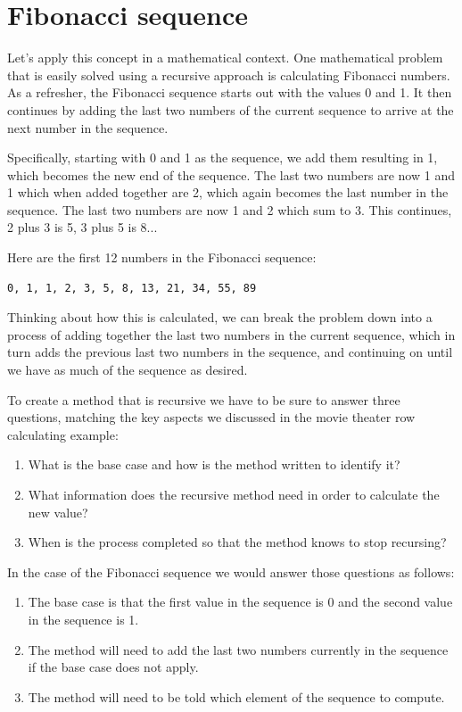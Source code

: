 \section{Fibonacci sequence}    

Let's apply this concept in a mathematical context. One mathematical problem that is easily solved using a recursive approach is calculating Fibonacci numbers. As a refresher, the Fibonacci sequence starts out with the values 0 and 1. It then continues by adding the last two numbers of the current sequence to arrive at the next number in the sequence.

Specifically, starting with 0 and 1 as the sequence, we add them resulting in 1, which becomes the new end of the sequence. The last two numbers are now 1 and 1 which when added together are 2, which again becomes the last number in the sequence. The last two numbers are now 1 and 2 which sum to 3. This continues, 2 plus 3 is 5, 3 plus 5 is 8...

Here are the first 12 numbers in the Fibonacci sequence:

\beforeverb
\begin{verbatim}
0, 1, 1, 2, 3, 5, 8, 13, 21, 34, 55, 89
\end{verbatim}

Thinking about how this is calculated, we can break the problem down into a process of adding together the last two numbers in the current sequence, which in turn adds the previous last two numbers in the sequence, and continuing on until we have as much of the sequence as desired.

To create a method that is recursive we have to be sure to answer three questions, matching the key aspects we discussed in the movie theater row calculating example:

\begin{enumerate}
	\item What is the base case and how is the method written to identify it?
		
	\item What information does the recursive method need in order to calculate the new value?
	
	\item When is the process completed so that the method knows to stop recursing?
\end{enumerate}

In the case of the Fibonacci sequence we would answer those questions as follows:

\begin{enumerate}
	\item The base case is that the first value in the sequence is 0 and the second value in the sequence is 1.

	\item The method will need to add the last two numbers currently in the sequence if the base case does not apply.

	\item The method will need to be told which element of the sequence to compute.
\end{enumerate}

